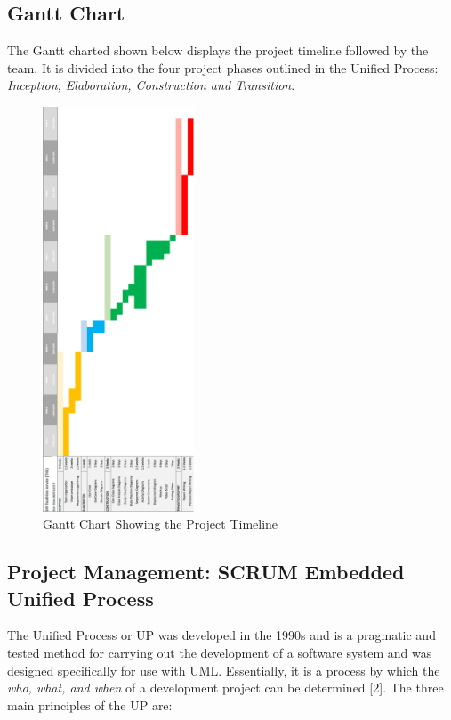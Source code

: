 \hypertarget{gantt-chart}{%
\subsection{Gantt Chart}\label{gantt-chart}}

The Gantt charted shown below displays the project timeline followed by
the team. It is divided into the four project phases outlined in the
Unified Process:
\textit{Inception, Elaboration, Construction and Transition}.

\begin{figure}[H]
      \centering
      \includegraphics[trim = 0 0 0 0, clip, width=0.4\textwidth]{TempImg/gant.png}
      \caption{Gantt Chart Showing the Project Timeline}
 \end{figure}

\hypertarget{project-management-scrum-embedded-unified-process}{%
\subsection{Project Management: SCRUM Embedded Unified
Process}\label{project-management-scrum-embedded-unified-process}}

The Unified Process or UP was developed in the 1990s and is a pragmatic
and tested method for carrying out the development of a software system
and was designed specifically for use with UML. Essentially, it is a
process by which the \textit{who, what, and when} of a development
project can be determined {[}2{]}. The three main principles of the UP
are:


